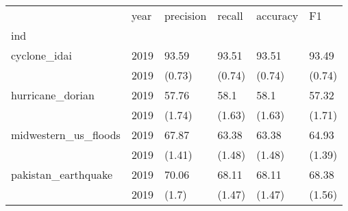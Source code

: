 \begin{tabular}{llllll}
\toprule
{} &  year & precision &  recall & accuracy &      F1 \\
ind                  &       &           &         &          &         \\
\midrule
cyclone\_idai         &  2019 &     93.59 &   93.51 &    93.51 &   93.49 \\
                     &  2019 &    (0.73) &  (0.74) &   (0.74) &  (0.74) \\
hurricane\_dorian     &  2019 &     57.76 &    58.1 &     58.1 &   57.32 \\
                     &  2019 &    (1.74) &  (1.63) &   (1.63) &  (1.71) \\
midwestern\_us\_floods &  2019 &     67.87 &   63.38 &    63.38 &   64.93 \\
                     &  2019 &    (1.41) &  (1.48) &   (1.48) &  (1.39) \\
pakistan\_earthquake  &  2019 &     70.06 &   68.11 &    68.11 &   68.38 \\
                     &  2019 &     (1.7) &  (1.47) &   (1.47) &  (1.56) \\
\bottomrule
\end{tabular}
